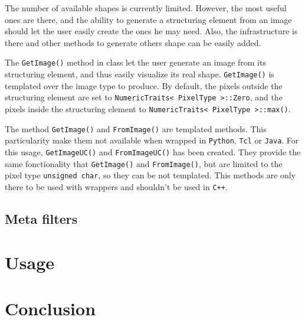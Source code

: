 \documentclass{InsightArticle}
\begin{document}
The number of available shapes is currently limited. However, the most useful
ones are there, and the ability to generate a structuring element from an
image should let the user easily create the ones he may need.
Also, the infrastructure is there and other methods to generate others shape
can be easily added.

The \verb$GetImage()$ method in  class let the user generate
an image from its structuring element, and thus easily visualize its real
shape. \verb$GetImage()$ is templated over the image type to produce. By default,
the pixels outside the structuring element are set to \verb$NumericTraits< PixelType >::Zero$,
and the pixels inside the structuring element to \verb$NumericTraits< PixelType >::max()$.

The method \verb$GetImage()$ and \verb$FromImage()$ are templated methods. This particularity
make them not available when wrapped in \verb$Python$, \verb$Tcl$ or \verb$Java$. For this usage,
\verb$GetImageUC()$ and \verb$FromImageUC()$ has been created. They provide the same fonctionality
that \verb$GetImage()$ and \verb$FromImage()$, but are limited to the pixel type \verb$unsigned char$, so
they can be not templated. This methods are only there to be used with wrappers
and shouldn't be used in \verb$C++$.

 \subsection{Meta filters}


\section{Usage}

\section{Conclusion}



\end{document}
